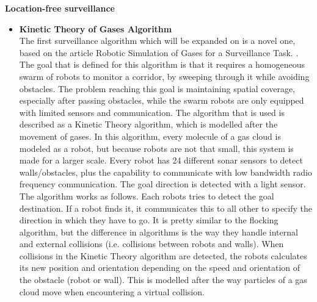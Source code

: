 \textbf{Location-free surveillance}
\begin{itemize}
\item \textbf{Kinetic Theory of Gases Algorithm}\\
The first surveillance algorithm which will be expanded on is a novel one, based on the article Robotic Simulation of Gases for a Surveillance Task. \cite{Kerr2005}.
The goal that is defined for this algorithm is that it requires a homogeneous swarm of robots to monitor a corridor, by sweeping through it while avoiding obstacles. 
The problem reaching this goal is maintaining spatial coverage, especially after passing obstacles, while the swarm robots are only equipped with limited sensors and communication.
The algorithm that is used is described as a Kinetic Theory algorithm, which is modelled after the movement of gases. 
In this algorithm, every molecule of a gas cloud is modeled as a robot, but because robots are not that small, this system is made for a larger scale. 
Every robot has 24 different sonar sensors to detect walls/obstacles, plus the capability to communicate with low bandwidth radio frequency communication. 
The goal direction is detected with a light sensor.\\
The algorithm works as follows. Each robots tries to detect the goal destination. If a robot finds it, it communicates this to all other to specify the direction in which they have to go. 
It is pretty similar to the flocking algorithm, but the difference in algorithms is the way they handle internal and external collisions (i.e. collisions between robots and walls). 
When collisions in the Kinetic Theory algorithm are detected, the robots calculates its new position and orientation depending on the speed and orientation of the obstacle (robot or wall). 
This is modelled after the way particles of a gas cloud move when encountering a virtual collision. 

\end{itemize}

